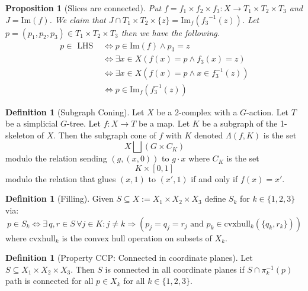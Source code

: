 \documentclass[12pt,parskip=full]{report}
\theoremstyle{plain}
\newtheorem{prop}[thm]{Proposition}
\theoremstyle{definition}
\newtheorem{dfn}[thm]{Definition}
\begin{document}
\begin{prop}
    [Slices are connected]
 \label{prop:fibershomeoplanes} 
    Put \(f =  f_{1} \times f_{2} \times f_{3}: X \to T_{1} \times T_{2} \times T_{3} \) and \(J = \text{Im}(f)\). We claim that \(J \cap T_{1} \times T_{2} \times \{z\} = \text{Im}_{f} ({ f_{3}}^{-1}(z))\). Let \(p = (p_{1}, p_{2} , p_{3}) \in T_{1} \times T_{2} \times T_{3}\) then we have the following. 
    \begin{align*}
        p \in \text { LHS } & \Longleftrightarrow p \in \text{Im}(f) \wedge p_{3} = z \\ 
        & \Longleftrightarrow \exists x \in X (f(x)=p \wedge  f_3(x)=z)\\
        & \Longleftrightarrow \exists x \in X (f(x)=p \wedge x \in f_3^{-1} (z))\\
        & \Longleftrightarrow p \in \text{Im}_f(f_3^{-1} (z))
    \end{align*}
\end{prop}

\begin{dfn}
    [Subgraph Coning]
    \label{dfn:subgraphconing}
    Let \(X\) be a 2-complex with a \(G\)-action. Let \(T\) be a simplicial \(G\)-tree. Let \(f:X\to T\) be a map. Let \(K\) be a subgraph of the 1-skeleton of \(X\). Then the subgraph cone of \(f\) with \(K\) denoted \(\Lambda(f, K)\) is the set \[X \bigsqcup \left(G\times C_K\right)\] modulo the relation sending \((g, (x,0))\) to \(g\cdot x\) where \(C_K\) is the set \[ K\times [0,1]\] modulo the relation that glues \((x,1)\) to \((x', 1)\) if and only if \(f(x) = x'\). 
\end{dfn}

\begin{dfn}
	[Filling]
	\label{defn:filling}
    Given \(S \subseteq X := X_1\times X_2\times X_3\) define \(S_{k}\) for \(k \in \{1,2,3\}\) via: 
    \[
        p \in S_{k} \iff \exists 
        \,q,r\in S\, \forall j\in K: j\neq k 
        \Longrightarrow ( p_{j} = q_{j} = r_{j}
        \text{ and } p_{k} \in \text{cvxhull}_k (\{q_{k} , r_{k}\}))
    \] 
    where \(\text{cvxhull}_k\) is the convex hull operation on subsets of \(X_k\).
\end{dfn}

\begin{dfn}
    [Property CCP: Connected in coordinate planes]
    \label{defn:ccp} 
    Let \(S \subseteq X_1\times X_2\times X_3\). Then \(S\) is connected in all coordinate planes if \(S \cap \pi_{k}^{-1} (p)\) path is connected for all \(p \in X_{k}\) for all \(k\in \{1,2,3\}\).
\end{dfn}
\end{document}
